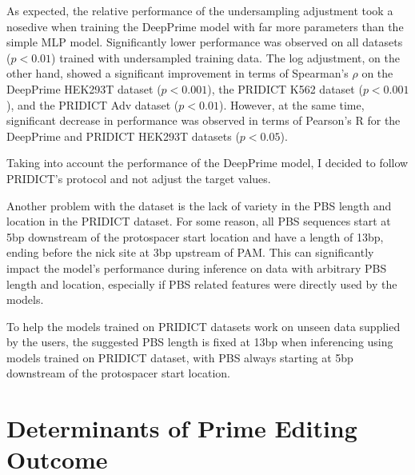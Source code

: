 As expected, the relative performance of the undersampling adjustment took a nosedive when training the DeepPrime model with far more parameters than the simple MLP model. Significantly lower performance was observed on all datasets ($p<0.01$) trained with undersampled training data. The log adjustment, on the other hand, showed a significant improvement in terms of Spearman's $\rho$ on the DeepPrime HEK293T dataset ($p<0.001$), the PRIDICT K562 dataset ($p<0.001$), and the PRIDICT Adv dataset ($p<0.01$). However, at the same time, significant decrease in performance was observed in terms of Pearson's R for the DeepPrime and PRIDICT HEK293T datasets ($p<0.05$). 

Taking into account the performance of the DeepPrime model, I decided to follow PRIDICT's protocol and not adjust the target values. 

Another problem with the dataset is the lack of variety in the PBS length and location in the PRIDICT dataset. For some reason, all PBS sequences start at 5bp downstream of the protospacer start location and have a length of 13bp, ending before the nick site at 3bp upstream of PAM. This can significantly impact the model's performance during inference on data with arbitrary PBS length and location, especially if PBS related features were directly used by the models. 

To help the models trained on PRIDICT datasets work on unseen data supplied by the users, the suggested PBS length is fixed at 13bp when inferencing using models trained on PRIDICT dataset, with PBS always starting at 5bp downstream of the protospacer start location.



\section{Determinants of Prime Editing Outcome}
\label{sec:determinants}

